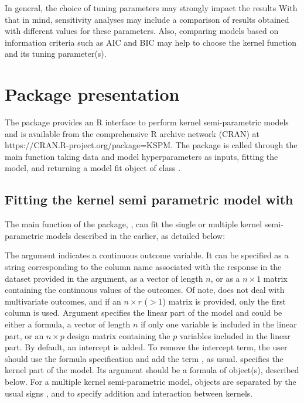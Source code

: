 In general, the choice of tuning parameters may strongly impact the results With that in mind, sensitivity analyses may include a comparison of results obtained with different values for these parameters. Also, comparing models based on information criteria such as AIC and BIC may help to choose the kernel function and its tuning parameter(s). 

\section{Package presentation} \label{sec:package}
\begin{sloppypar}
The  package provides an R interface to perform kernel semi-parametric models and is available from the comprehensive R archive network (CRAN) at https://CRAN.R-project.org/package=KSPM. The package is called through the main function  taking data and model hyperparameters as inputs, fitting the model, and returning a model fit object of class .
\end{sloppypar}



\subsection{Fitting the kernel semi parametric model with } \label{sec:package-kspm}

The main function of the package, , can fit the single or multiple kernel semi-parametric models described in the earlier, as detailed below:


The argument  indicates a continuous outcome variable. It can be specified as a string corresponding to the column name associated with the response in the dataset provided in the  argument, as a vector of length $n$, or as a $n \times 1$ matrix containing the continuous values of the outcomes. Of note,  does not deal with multivariate outcomes, and if an $n \times r$ ($>1$) matrix is provided, only the first column is used. Argument  specifies the linear part of the model and could be either a formula, a vector of length $n$ if only one variable is included in the linear part, or an $n \times p$ design matrix containing the $p$ variables included in the linear part. By default, an intercept is added. To remove the intercept term, the user should use the formula specification and add the term , as usual.  specifies the kernel part of the model. Its argument should be a formula of  object(s), described below. For a multiple kernel semi-parametric model,  objects are separated by the usual signs ,  and  to specify addition and interaction between kernels. 

